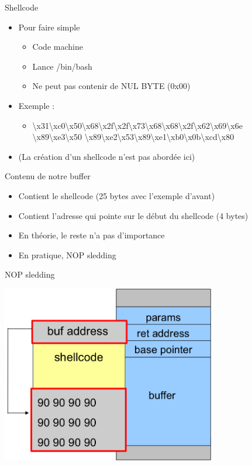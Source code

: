 \documentclass{beamer}
\begin{document}
\begin{frame}{Shellcode}
	\begin{itemize}
		\itemsep1.3em
		\item[] Pour faire simple
		\begin{itemize}
			\itemsep1.3em
			\item Code machine
			\item Lance /bin/bash
			\item Ne peut pas contenir de NUL BYTE (0x00)
		\end{itemize}
		\item[] Exemple :
		\begin{itemize}
			\item[] \textbackslash x31\textbackslash xc0\textbackslash x50\textbackslash x68\textbackslash x2f\textbackslash x2f\textbackslash x73\textbackslash x68\textbackslash x68\textbackslash x2f\textbackslash x62\textbackslash x69\textbackslash x6e\\ \textbackslash x89\textbackslash xe3\textbackslash x50 \textbackslash x89\textbackslash xe2\textbackslash x53\textbackslash x89\textbackslash xe1\textbackslash xb0\textbackslash x0b\textbackslash xcd\textbackslash x80
		\end{itemize}
		\item[] (La création d'un shellcode n'est pas abordée ici)
	\end{itemize}
\end{frame}

\begin{frame}{Contenu de notre buffer}
	\begin{itemize}
		\itemsep1.3em
		\item Contient le shellcode (25 bytes avec l'exemple d'avant)
		\item Contient l'adresse qui pointe sur le début du shellcode (4 bytes)
		\item En théorie, le reste n'a pas d'importance
		\item En pratique, NOP sledding
	\end{itemize}
\end{frame}
\begin{frame}{NOP sledding}
	\begin{center}
		\includegraphics[width=0.7\textwidth]{images/nop-sledding.png}
	\end{center}
\end{frame}
\end{document}
